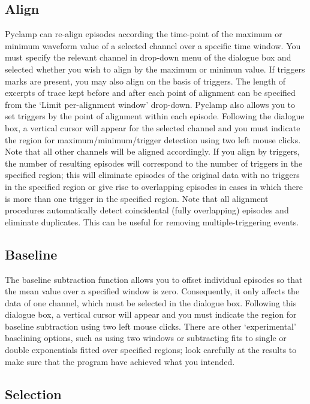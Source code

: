\documentclass{article}
\begin{document}
\subsection{Align}

Pyclamp can re-align episodes according the time-point of the maximum or minimum waveform value of a selected channel
over a specific time window. You must specify the relevant channel in drop-down menu of the dialogue box and selected
whether you wish to align by the maximum or minimun value. If triggers marks are present, you may also align on the
basis of triggers. The length of excerpts of trace kept before and after each point of alignment can be specified from
the `Limit per-alignment window' drop-down. Pyclamp also allows you to set triggers by the point of alignment within
each episode. Following the dialogue box, a vertical cursor will appear for the selected channel and you must indicate
the region for maximum/minimum/trigger detection using two left mouse clicks. Note that all other channels will be
aligned accordingly. If you align by triggers, the number of resulting episodes will correspond to the number of
triggers in the specified region; this will eliminate episodes of the original data with no triggers in the specified
region or give rise to overlapping episodes in cases in which there is more than one trigger in the specified region.
Note that all alignment procedures automatically detect coincidental (fully overlapping) episodes and eliminate
duplicates. This can be useful for removing multiple-triggering events.

\subsection{Baseline}

The baseline subtraction function allows you to offset individual episodes so that the mean value over a specified
window is zero.  Consequently, it only affects the data of one channel, which must be selected in the dialogue box.
Following this dialogue box, a vertical cursor will appear and you must indicate the region for baseline subtraction
using two left mouse clicks. There are other `experimental' baselining options, such as using two windows or
subtracting fits to single or double exponentials fitted over specified regions; look carefully at the results to make
sure that the program have achieved what you intended.

\subsection{Selection}
\end{document}
